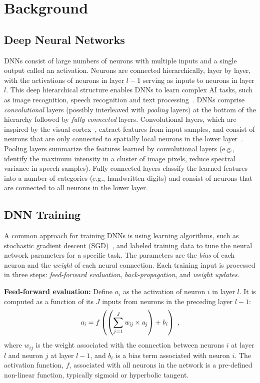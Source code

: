 \section{Background}
\label{sec:background}

\subsection{Deep Neural Networks}
\label{subsec:dnn}
DNNs consist of large numbers of neurons with multiple inputs and a single output called an activation. Neurons are connected hierarchically, layer by layer, with the activations of neurons in layer $l-1$ serving as inputs to neurons in layer $l$.  This deep hierarchical structure enables DNNs to learn complex AI tasks, such as image recognition, speech recognition and text processing~\cite{Bengio09}. DNNs comprise {\it convolutional} layers (possibly interleaved with {\it pooling} layers) at the bottom of the hierarchy followed by {\it fully connected} layers.  Convolutional layers, which are inspired by the visual cortex~\cite{Hubel59}, extract features from input samples, and consist of neurons that are only connected to spatially local neurons in the lower layer~\cite{LeCun98b}.  Pooling layers summarize the features learned by convolutional layers (e.g., identify the maximum intensity in a cluster of image pixels, reduce spectral variance in speech samples).  Fully connected layers classify the learned features into a number of categories (e.g., handwritten digits) and consist of neurons that are connected to all neurons in the lower layer.

\subsection{DNN Training}
A common approach for training DNNs is using  learning algorithms, such as stochastic gradient descent (SGD)~\cite{Bottou10}, and labeled training data to tune the neural network parameters for a specific task. The parameters are the {\em bias} of each neuron and the {\em weight} of each neural connection. Each training input is processed in three steps: {\em feed-forward evaluation}, {\em back-propagation}, and {\em weight updates}.

{\bf Feed-forward evaluation:}
Define $a_{i}$ as the activation of neuron $i$ in layer $l$. It is computed as a function of its $J$ inputs from neurons in the preceding layer $l-1$:
\begin{equation}
{\it a_{i}} = f\left(\left(\sum\limits_{j=1}^{J}{\it w_{ij}} \times {\it a_{j}}\right) + {\it b_{i}}\right) \ ,
\label{eqn:fwd_activation}
\end{equation}
where $w_{ij}$ is the weight associated with the connection between neurons $i$ at layer $l$ and neuron $j$ at layer $l-1$, and $b_{i}$ is a bias term associated with neuron $i$. The activation function, $f$, associated with all neurons in the network is a pre-defined non-linear function, typically sigmoid or hyperbolic tangent.

